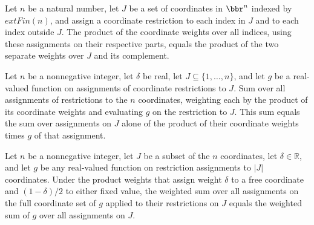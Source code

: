 \begin{theorem}
\label{FABL.coordRestrictionProductWeight_split}
\leanok
{}
Let $n$ be a natural number, let $J$ be a set of coordinates in $\bbr^n$ indexed by
$	ext{Fin}(n)$, and assign a coordinate restriction to each index in $J$ and to each
index outside $J$. The product of the coordinate weights over all indices, using these
assignments on their respective parts, equals the product of the two separate weights
over $J$ and its complement.
\end{theorem}

\begin{theorem}
\label{FABL.sum_coordRestrictionProductWeight_restrict}
\leanok
{}
Let $n$ be a nonnegative integer, let $\delta$ be real, let
$J\subseteq\{1,\ldots,n\}$, and let $g$ be a real-valued function on assignments of
coordinate restrictions to $J$. Sum over all assignments of restrictions to the $n$
coordinates, weighting each by the product of its coordinate weights and evaluating $g$
on the restriction to $J$. This sum equals the sum over assignments on $J$ alone of the
product of their coordinate weights times $g$ of that assignment.
\end{theorem}

\begin{theorem}
\label{FABL.sum_restrictionAssignmentWeightAt_comp_freeCoordinateEmbedding}
\leanok
{}
Let $n$ be a nonnegative integer, let $J$ be a subset of the $n$ coordinates, let
$\delta\in\mathbb R$, and let $g$ be any real-valued function on restriction assignments
to $|J|$ coordinates. Under the product weights that assign weight $\delta$ to a free
coordinate and $(1-\delta)/2$ to either fixed value, the weighted sum over all
assignments on the full coordinate set of $g$ applied to their restrictions on $J$
equals the weighted sum of $g$ over all assignments on $J$.
\end{theorem}

